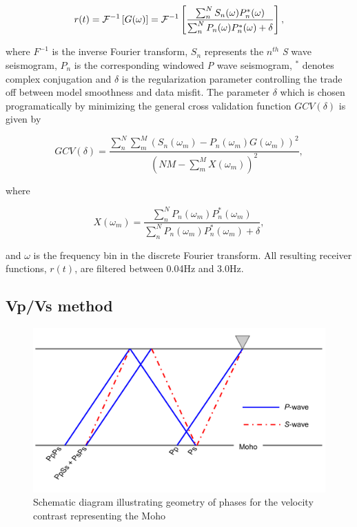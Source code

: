 \documentclass[draft, 12pt]{article}
\begin{document}
\begin{equation}
  r(t) = {\cal F}^{-1} \left[ G(\omega) \right] = {\cal F}^{-1}
 \left[ \frac {\sum_n^N S_n(\omega)P_n^*(\omega)} {\sum_n^N P_n(\omega)P_n^*(\omega) + \delta} \right ],
\end{equation}

\noindent where $F^{-1}$ is the inverse Fourier transform, $S_n$ represents the $n^{th}$ {\it S} wave seismogram, $P_n$ is the corresponding windowed {\it P} wave seismogram, $^*$ denotes complex conjugation and $\delta$ is the regularization parameter controlling the trade off between model smoothness and data misfit. The parameter $\delta$ which is chosen programatically by minimizing the general cross validation function $GCV(\delta)$ is given by

\begin{equation}
  GCV(\delta) = \frac {\sum_n^N\sum_m^M \left( S_n(\omega_m) - P_n(\omega_m)G(\omega_m) \right)^2 }
                      { \left( NM - \sum_m^M X(\omega_m) \right)^2 },
\end{equation}

\noindent where

\begin{equation}
  X(\omega_m) = \frac {\sum_n^N P_n(\omega_m)P_n^*(\omega_m)} {\sum_n^N P_n(\omega_m)P_n^*(\omega_m) + \delta},
\end{equation}

\noindent and $\omega$ is the frequency bin in the discrete Fourier transform. All resulting receiver functions, $r(t)$, are filtered between 0.04Hz and 3.0Hz.







\subsection{Vp/Vs method} \label{section:VpVsMethod}

\begin{figure}
  \centering
    \includegraphics[width=\textwidth]{reflectedPhases}
  \caption{Schematic diagram illustrating geometry of phases for the velocity contrast representing the Moho}
  \label{fig:reflectedPhases}
\end{figure}
\end{document}
